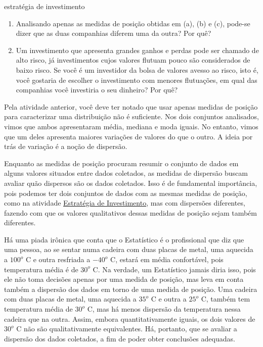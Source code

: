 \begin{task}{estratégia de investimento}
\begin{enumerate}
\item {} 
Analisando apenas as medidas de posição obtidas em (a), (b) e (c), pode-se dizer que as duas companhias diferem uma da outra? Por quê?

\item {} 
Um investimento que apresenta grandes ganhos e perdas pode ser chamado de alto risco, já investimentos cujos valores flutuam pouco são considerados de baixo risco. Se você é um investidor da bolsa de valores avesso ao risco, isto é, você gostaria de escolher o investimento com menores flutuações, em qual das companhias você investiria o seu dinheiro? Por quê?

\end{enumerate}
\end{task}

\label{\detokenize{PE104-4:sec-organizando2}}\label{\detokenize{PE104-4::doc}}\label{\detokenize{PE104-4:organizando-as-ideias-medidas-de-dispersao}}
Pela atividade anterior, você deve ter notado que usar apenas medidas de posição para caracterizar uma distribuição não é suficiente. Nos dois conjuntos analisados, vimos que ambos apresentaram média, mediana e moda iguais. No entanto, vimos que um deles apresenta maiores variações de valores do que o outro. A ideia por trás de variação é a noção de dispersão.

Enquanto as medidas de posição procuram resumir o conjunto de dados em alguns valores situados entre dados coletados, as medidas de dispersão buscam avaliar quão dispersos são os dados coletados. Isso é de fundamental importância, pois podemos ter dois conjuntos de dados com as mesmas medidas de posição, como na atividade \hyperref[\detokenize{PE104-3:ativ-estrategia-de-investimento}]{Estratégia de Investimento}, mas com dispersões diferentes, fazendo com que os valores qualitativos dessas medidas de posição sejam também diferentes.

Há uma piada irônica que conta que o Estatístico é o profissional que diz que uma pessoa, ao se sentar numa cadeira com duas placas de metal, uma aquecida a \(100^o\) C e outra resfriada a \(-40^o\) C, estará em média confortável, pois temperatura média é de \(30^o\) C. Na verdade, um Estatístico jamais diria isso, pois ele não toma decisões apenas por uma medida de posição, mas leva em conta também a dispersão dos dados em torno de uma medida de posição. Uma cadeira com duas placas de metal, uma aquecida a \(35^o\) C e outra a \(25^o\) C, também tem temperatura média de \(30^o\) C, mas há menos dispersão da temperatura nessa cadeira que na outra. Assim, embora quantitativamente iguais, os dois valores de \(30^o\) C não são qualitativamente equivalentes. Há, portanto, que se avaliar a dispersão dos dados coletados, a fim de poder obter conclusões adequadas.


